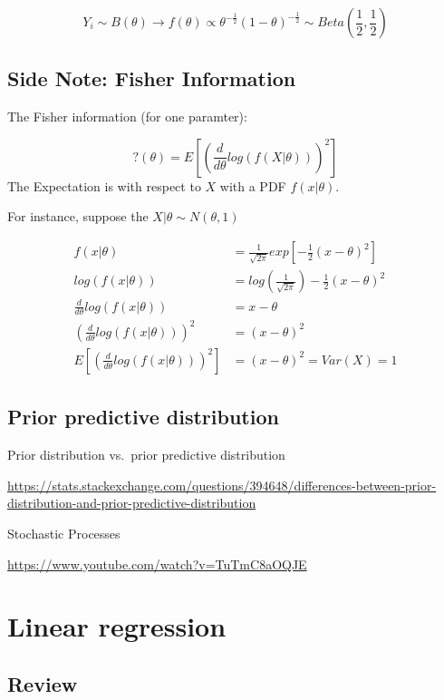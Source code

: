 \documentclass[
]{book}
\begin{document}
\[Y_i \sim B(\theta) \rightarrow f(\theta) \propto \theta ^{-\frac{1}{2}}(1-\theta)^{-\frac{1}{2}}\sim Beta(\frac{1}{2},\frac{1}{2})\]

\hypertarget{side-note-fisher-information}{%
\subsection{Side Note: Fisher Information}\label{side-note-fisher-information}}

The Fisher information (for one paramter):

\[?(\theta)=E[(\frac{d}{d\theta} log(f(X|\theta)))^2]\]
The Expectation is with respect to \(X\) with a PDF \(f(x|\theta)\).

For instance, suppose the \(X|\theta \sim N(\theta,1)\)

\[\begin{aligned} f(x|\theta) &=\frac{1}{\sqrt{2 \pi}} exp[-\frac{1}{2}(x-\theta)^2] \\ log(f(x|\theta)) &= log(\frac{1}{\sqrt{2 \pi}})-\frac{1}{2}(x-\theta)^2 \\ \frac{d}{d\theta}log(f(x|\theta)) &=x-\theta \\ (\frac{d}{d\theta}log(f(x|\theta)))^2 &=(x-\theta)^2 \\E[(\frac{d}{d\theta}log(f(x|\theta)))^2]&=(x-\theta)^2=Var(X)=1 \end{aligned}\]

\hypertarget{prior-predictive-distribution}{%
\subsection{Prior predictive distribution}\label{prior-predictive-distribution}}

Prior distribution vs.~prior predictive distribution

\url{https://stats.stackexchange.com/questions/394648/differences-between-prior-distribution-and-prior-predictive-distribution}

Stochastic Processes

\url{https://www.youtube.com/watch?v=TuTmC8aOQJE}

\hypertarget{linear-regression}{%
\section{Linear regression}\label{linear-regression}}

\hypertarget{review}{%
\subsection{Review}\label{review}}
\end{document}
